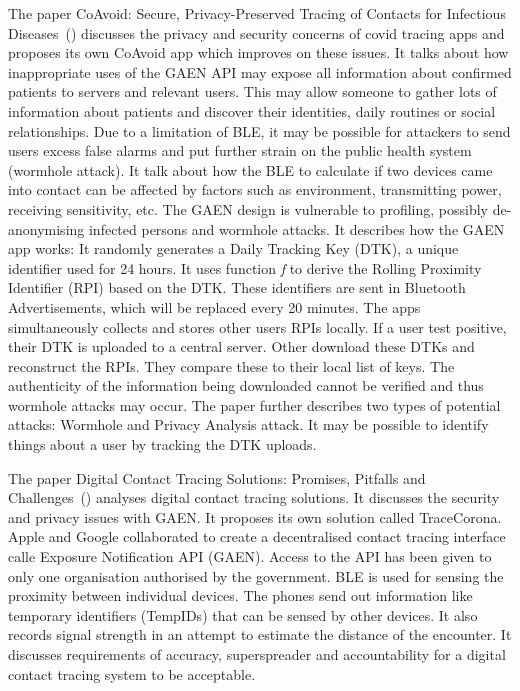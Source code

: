 The paper CoAvoid: Secure, Privacy-Preserved Tracing of
Contacts for Infectious Diseases~(\cite{9908579}) discusses the privacy and security concerns of covid tracing apps and proposes its own CoAvoid app which improves on these issues. It talks about how inappropriate uses of the GAEN API may expose all information about confirmed patients to servers and relevant users. This may allow someone to gather lots of information about patients and discover their identities, daily routines or social relationships. Due to a limitation of BLE, it may be possible for attackers to send users excess false alarms and put further strain on the public health system (wormhole attack). It talk about how the BLE to calculate if two devices came into contact can be affected by factors such as environment, transmitting power, receiving sensitivity, etc. The GAEN design is vulnerable to profiling, possibly de-anonymising infected persons and wormhole attacks. It describes how the GAEN app works: It randomly generates a Daily Tracking Key (DTK), a unique identifier used for 24 hours. It uses function {\it f} to derive the Rolling Proximity Identifier (RPI) based on the DTK. These identifiers are sent in Bluetooth Advertisements, which will be replaced every 20 minutes. The apps simultaneously collects and stores other users RPIs locally. If a user test positive, their DTK is uploaded to a central server. Other download these DTKs and reconstruct the RPIs. They compare these to their local list of keys. The authenticity of the information being downloaded cannot be verified and thus wormhole attacks may occur. The paper further describes two types of potential attacks: Wormhole and Privacy Analysis attack. It may be possible to identify things about a user by tracking the DTK uploads.

The paper Digital Contact Tracing Solutions: Promises, Pitfalls
and Challenges~(\cite{9931613}) analyses digital contact tracing solutions. It discusses the security and privacy issues with GAEN. It proposes its own solution called TraceCorona. Apple and Google collaborated to create a decentralised contact tracing interface calle Exposure Notification API (GAEN). Access to the API has been given to only one organisation authorised by the government. BLE is used for sensing the proximity between individual devices. The phones send out information like temporary identifiers (TempIDs) that can be sensed by other devices. It also records signal strength in an attempt to estimate the distance of the encounter. It discusses requirements of accuracy, superspreader and accountability for a digital contact tracing system to be acceptable.

